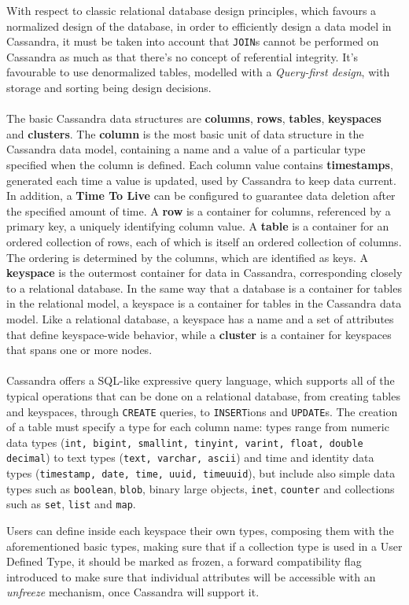 With respect to classic relational database design principles, which favours a normalized design of the database, in order to efficiently design a data model in Cassandra, it must be taken into account that \texttt{JOIN}s cannot be performed on Cassandra as much as that there's no concept of referential integrity. It's favourable to use denormalized tables, modelled with a \textit{Query-first design}, with storage and sorting being design decisions.\\
\\
The basic Cassandra data structures are \textbf{columns}, \textbf{rows}, \textbf{tables}, \textbf{keyspaces} and \textbf{clusters}. The \textbf{column} is the most basic unit of data structure in the Cassandra data model, containing a name and a value of a particular type specified when the column is defined. Each column value contains \textbf{timestamps}, generated each time a value is updated, used by Cassandra to keep data current. In addition, a \textbf{Time To Live} can be configured to guarantee data deletion after the specified amount of time. A \textbf{row} is a container for columns, referenced by a primary key, a uniquely identifying column value. A \textbf{table} is a container for an ordered collection of rows, each of which is itself an ordered collection of columns. The ordering is determined by the columns, which are identified as keys. A \textbf{keyspace} is the outermost container for data in Cassandra, corresponding closely to a relational database. In the same way that a database is a container for tables in the relational model, a keyspace is a container for tables in the Cassandra data model. Like a relational database, a keyspace has a name and a set of attributes that define keyspace-wide behavior, while a \textbf{cluster} is a container for keyspaces that spans one or more nodes.\\
\\
Cassandra offers a SQL-like expressive query language, which supports all of the typical operations that can be done on a relational database, from creating tables and keyspaces, through \texttt{CREATE} queries, to \texttt{INSERT}ions and \texttt{UPDATE}s. The creation of a table must specify a type for each column name: types range from numeric data types (\texttt{int, bigint, smallint, tinyint, varint, float, double decimal}) to text types (\texttt{text, varchar, ascii}) and time and identity data types (\texttt{timestamp, date, time, uuid, timeuuid}), but include also simple data types such as \texttt{boolean}, \texttt{blob}, binary large objects, \texttt{inet}, \texttt{counter} and collections such as \texttt{set}, \texttt{list} and \texttt{map}.

Users can define inside each keyspace their own types, composing them with the aforementioned basic types, making sure that if a collection type is used in a User Defined Type, it should be marked as frozen, a forward compatibility flag introduced to make sure that individual attributes will be accessible with an \textit{unfreeze} mechanism, once Cassandra will support it.